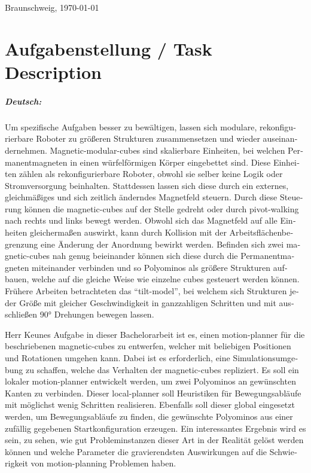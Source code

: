 \documentclass[11pt,a4paper,twoside,titlepage]{scrbook}
\theoremstyle{definition}
\begin{document}
	\par
	\bigskip\noindent Braunschweig, \today \par
	\vspace*{10mm}
	\hfill\hrulefill
	\cleardoublepage
	
	
	\chapter*{Aufgabenstellung / Task Description}


\paragraph{Deutsch:}
\begin{otherlanguage}{ngerman}
	Um spezifische Aufgaben besser zu bewältigen, lassen sich modulare, rekonfigurierbare Roboter zu größeren Strukturen zusammensetzen und wieder auseinandernehmen.
	Magnetic-modular-cubes sind skalierbare Einheiten, bei welchen Permanentmagneten in einen würfelförmigen Körper eingebettet sind.
	Diese Einheiten zählen als rekonfigurierbare Roboter, obwohl sie selber keine Logik oder Stromversorgung beinhalten.
	Stattdessen lassen sich diese durch ein externes, gleichmäßiges und sich zeitlich änderndes Magnetfeld steuern.
	Durch diese Steuerung können die magnetic-cubes auf der Stelle gedreht oder durch pivot-walking nach rechts und links bewegt werden.
	Obwohl sich das Magnetfeld auf alle Einheiten gleichermaßen auswirkt, kann durch Kollision mit der Arbeitsflächenbegrenzung eine Änderung der Anordnung bewirkt werden.
	Befinden sich zwei magnetic-cubes nah genug beieinander können sich diese durch die Permanentmagneten miteinander verbinden und so Polyominos als größere Strukturen aufbauen,
	welche auf die gleiche Weise wie einzelne cubes gesteuert werden können.
	Frühere Arbeiten betrachteten das "`tilt-model"', bei welchem sich Strukturen jeder Größe mit gleicher Geschwindigkeit in ganzzahligen Schritten und mit ausschließen 90° Drehungen bewegen lassen.
	
	Herr Keunes Aufgabe in dieser Bachelorarbeit ist es, einen motion-planner für die beschriebenen magnetic-cubes zu entwerfen, welcher mit beliebigen Positionen und Rotationen umgehen kann.
	Dabei ist es erforderlich, eine Simulationsumgebung zu schaffen, welche das Verhalten der magnetic-cubes repliziert.
	Es soll ein lokaler motion-planner entwickelt werden, um zwei Polyominos an gewünschten Kanten zu verbinden.
	Dieser local-planner soll Heuristiken für Bewegungsabläufe mit möglichst wenig Schritten realisieren.
	Ebenfalls soll dieser global eingesetzt werden, um Bewegungsabläufe zu finden, die gewünschte Polyominos aus einer zufällig gegebenen Startkonfiguration erzeugen.
	Ein interessantes Ergebnis wird es sein, zu sehen, wie gut Probleminstanzen dieser Art in der Realität gelöst werden können und welche Parameter die gravierendsten Auswirkungen auf die Schwierigkeit von motion-planning Problemen haben. 
	
\end{otherlanguage}
\end{document}
